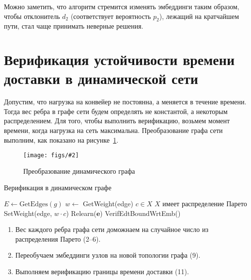 \documentclass[a4paper]{article}
\newcommand{\fig}[3][1]{
    \begin{figure}[H]
        \centering
        \texttt{[image: figs/\#2]}
        \caption{#3}\label{#2}
    \end{figure}
}
\begin{document}
Можно заметить, что алгоритм стремится изменять эмбеддинги таким образом, чтобы
отклонитель $d_2$ (соответствует вероятность $p_2$), лежащий на кратчайшем
пути, стал чаще принимать неверные решения.

\section{Верификация устойчивости времени доставки в динамической сети}

Допустим, что нагрузка на конвейер не постоянна, а меняется в течение времени.
Тогда вес ребра в графе сети будем определять не константой, а некоторым
распределением. Для того, чтобы выполнить верификацию, возьмем момент времени,
когда нагрузка на сеть максимальна. Преобразование графа сети выполним, как
показано на рисунке~\ref{dyn-gr}.

\fig[.4]{dyn-gr}{Преобразование динамического графа}

\begin{listing}[H]
\caption{Верификация в динамическом графе}\label{VerifDynNetwork}
\begin{algorithmic}[1]
    \State $E \gets \text{GetEdges}(g)$
        \State $w \gets$ GetWeight(edge)
        \State $c \in X$ \Comment $X$ имеет распределение Парето
        \State SetWeight(edge, $w \cdot c$)
    \EndFor
    \State
    \State Relearn($\bm{e}$)
    \State
    \State \Return VerifEdtBoundWrtEmb()
\EndFunction
\end{algorithmic}
\end{listing}

\begin{enumerate}
    \item Вес каждого ребра графа сети доможнаем на случайное число из
        распределения Парето (2--6).

    \item Переобучаем эмбеддинги узлов на новой топологии графа (9).

    \item Выполняем верификацию границы времени доставки (11).
\end{enumerate}
\end{document}
